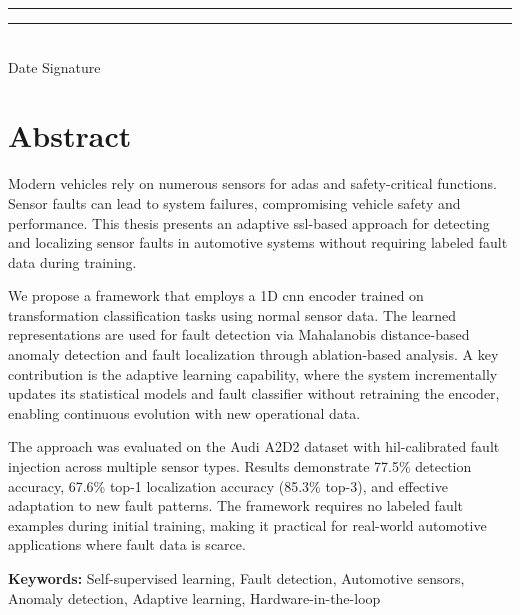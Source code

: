 \documentclass[12pt,a4paper,twoside,openright]{scrbook}
\begin{document}
\noindent
\rule{5cm}{0.4pt} \hfill \rule{5cm}{0.4pt}\\
Date \hfill Signature

\cleardoublepage

\chapter*{Abstract}

Modern vehicles rely on numerous sensors for \gls{adas} and safety-critical functions. Sensor faults can lead to system failures, compromising vehicle safety and performance. This thesis presents an adaptive \gls{ssl}-based approach for detecting and localizing sensor faults in automotive systems without requiring labeled fault data during training.

We propose a framework that employs a 1D \gls{cnn} encoder trained on transformation classification tasks using normal sensor data. The learned representations are used for fault detection via Mahalanobis distance-based anomaly detection and fault localization through ablation-based analysis. A key contribution is the adaptive learning capability, where the system incrementally updates its statistical models and fault classifier without retraining the encoder, enabling continuous evolution with new operational data.

The approach was evaluated on the Audi A2D2 dataset with \gls{hil}-calibrated fault injection across multiple sensor types. Results demonstrate 77.5\% detection accuracy, 67.6\% top-1 localization accuracy (85.3\% top-3), and effective adaptation to new fault patterns. The framework requires no labeled fault examples during initial training, making it practical for real-world automotive applications where fault data is scarce.

\textbf{Keywords:} Self-supervised learning, Fault detection, Automotive sensors, Anomaly detection, Adaptive learning, Hardware-in-the-loop

\cleardoublepage

\tableofcontents
\cleardoublepage

\listoffigures
{}
\cleardoublepage

\listoftables
{}
\cleardoublepage

\printglossary[type=\acronymtype,title=List of Acronyms]
\cleardoublepage
\end{document}
